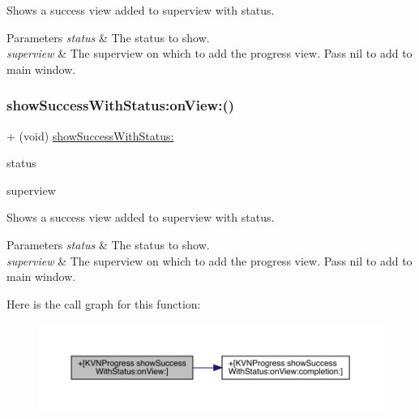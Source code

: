 Shows a success view added to {\ttfamily superview} with {\ttfamily status}. 
\begin{DoxyParams}{Parameters}
{\em status} & The status to show. \\
\hline
{\em superview} & The superview on which to add the progress view. Pass {\ttfamily nil} to add to main window. \\
\hline
\end{DoxyParams}
\mbox{\label{interface_k_v_n_progress_a86fcdede3818f360abfae851a7b1b7fc}} 
\subsubsection{\texorpdfstring{show\+Success\+With\+Status\+:on\+View\+:()}{showSuccessWithStatus:onView:()}\hspace{0.1cm}{\footnotesize\ttfamily [3/3]}}
{\footnotesize\ttfamily + (void) \mbox{\hyperlink{interface_k_v_n_progress_ae9b8b57302f6a4456658e758784790bf}{show\+Success\+With\+Status\+:}} \begin{DoxyParamCaption}\item[{(N\+S\+String $\ast$)}]{status }\item[{onView:(U\+I\+View $\ast$)}]{superview }\end{DoxyParamCaption}}

Shows a success view added to {\ttfamily superview} with {\ttfamily status}. 
\begin{DoxyParams}{Parameters}
{\em status} & The status to show. \\
\hline
{\em superview} & The superview on which to add the progress view. Pass {\ttfamily nil} to add to main window. \\
\hline
\end{DoxyParams}
Here is the call graph for this function\+:\nopagebreak
\begin{figure}[H]
\begin{center}
\leavevmode
\includegraphics[width=350pt]{interface_k_v_n_progress_a86fcdede3818f360abfae851a7b1b7fc_cgraph}
\end{center}
\end{figure}
\mbox{\label{interface_k_v_n_progress_a622aa6249f5eafaa2b61058bfe2f2d61}} 

